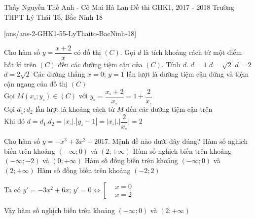 \begin{name}
	{Thầy Nguyễn Thế Anh - Cô Mai Hà Lan}
	{Đề thi GHK1, 2017 - 2018 Trường THPT Lý Thái Tổ, Bắc Ninh 18}
\end{name}
\setcounter{ex}{0}
[ans/ans-2-GHK1-55-LyThaito-BacNinh-18]
\begin{ex}%
	Cho hàm số $y=\dfrac{x+2}{x}$ có đồ thị $(C)$. Gọi $d$ là tích khoảng cách từ một điểm bất kì trên $(C)$ đến các đường tiệm cận của $(C)$. Tính $d$.
	\choice
	{$d=1$}
	{$d=\sqrt{2}$}
	{\True $d=2$}
	{$d=2\sqrt{2}$}
	\loigiai
	{Các đường thẳng $x=0$; $y=1$ lần lượt là đường tiệm cận đứng và tiệm cận ngang của đồ thị $(C)$\\
		Gọi $M(x_\circ; y_\circ)\in (C)$ với $y_\circ=\dfrac{x_\circ +2}{x_\circ}=1+\dfrac{2}{x_\circ}$\\
		Gọi $d_1; d_2$ lần lượt là khoảng cách từ $M$ đến các đường tiệm cận trên\\
		Khi đó $d=d_1. d_2=|x_\circ|.|y_\circ -1|=|x_\circ|.\bigg|\dfrac{2}{x_\circ}\bigg|=2$ }
\end{ex}

\begin{ex}%
	Cho hàm số $y=-x^3+3x^2-2017$. Mệnh đề nào dưới đây đúng?
	\choice
	{\True Hàm số nghịch biến trên khoảng $(-\infty;0)$ và $(2;+\infty)$}
	{Hàm số nghịch biến trên khoảng $(-\infty;-2)$ và $(0;+\infty)$}
	{Hàm số đồng biến trên khoảng $(-\infty;0)$ và $(2;+\infty)$}
	{Hàm số đồng biến trên khoảng $(-2;2)$}
	\loigiai
	{Ta có $y'=-3x^2+6x$; $y'=0
		\Leftrightarrow\left[\begin{aligned}&x=0\\&x=2\end{aligned}\right.$
		\begin{center}
		\end{center}
		Vậy hàm số nghịch biến trên khoảng $(-\infty;0)$ và $(2;+\infty)$}
\end{ex}

